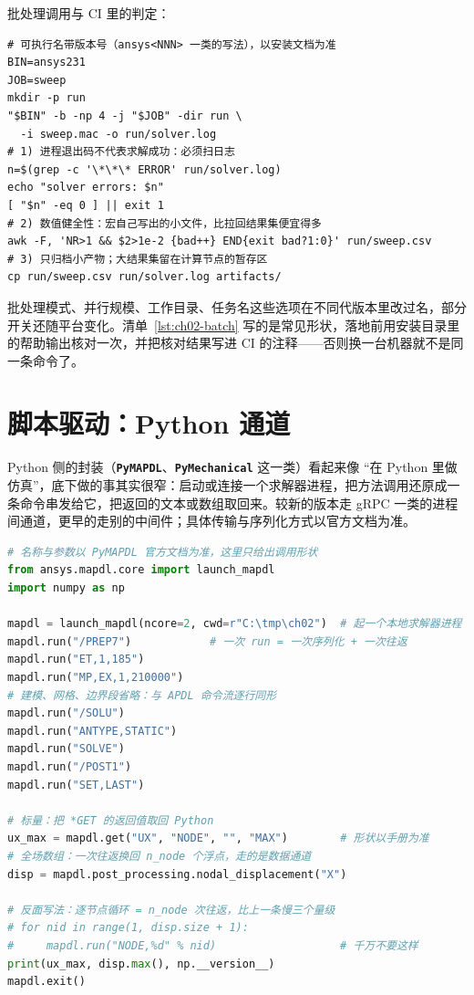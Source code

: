 \documentclass[12pt,a4paper,fontset=fandol]{ctexbook}
\newcommand{\Lib}[1]{\textbf{\texttt{#1}}}
\begin{document}
批处理调用与 CI 里的判定：

\begin{lstlisting}[language=ShellLD, style=shellstyle,
  caption={CI 中一次批处理求解：日志与结果文件分别处理},
  label={lst:ch02-batch}]
# 可执行名带版本号（ansys<NNN> 一类的写法），以安装文档为准
BIN=ansys231
JOB=sweep
mkdir -p run
"$BIN" -b -np 4 -j "$JOB" -dir run \
  -i sweep.mac -o run/solver.log
# 1) 进程退出码不代表求解成功：必须扫日志
n=$(grep -c '\*\*\* ERROR' run/solver.log)
echo "solver errors: $n"
[ "$n" -eq 0 ] || exit 1
# 2) 数值健全性：宏自己写出的小文件，比拉回结果集便宜得多
awk -F, 'NR>1 && $2>1e-2 {bad++} END{exit bad?1:0}' run/sweep.csv
# 3) 只归档小产物；大结果集留在计算节点的暂存区
cp run/sweep.csv run/solver.log artifacts/
\end{lstlisting}

\begin{note}[title={命令行选项的口径要按版本重新确认}]
批处理模式、并行规模、工作目录、任务名这些选项在不同代版本里改过名，部分开关还随平台变化。清单~\ref{lst:ch02-batch} 写的是常见形状，落地前用安装目录里的帮助输出核对一次，并把核对结果写进 CI 的注释——否则换一台机器就不是同一条命令了。
\end{note}

\section{脚本驱动：Python 通道}
\label{sec:ch02-python}

Python 侧的封装（\Lib{PyMAPDL}、\Lib{PyMechanical} 这一类）看起来像 ``在 Python 里做仿真''，底下做的事其实很窄：启动或连接一个求解器进程，把方法调用还原成一条命令串发给它，把返回的文本或数组取回来。较新的版本走 gRPC 一类的进程间通道，更早的走别的中间件；具体传输与序列化方式以官方文档为准。

\begin{lstlisting}[language=Python, style=pythonstyle,
  caption={Python 通道：一次调用一次往返，取结果是整份数组拷贝},
  label={lst:ch02-python}]
# 名称与参数以 PyMAPDL 官方文档为准，这里只给出调用形状
from ansys.mapdl.core import launch_mapdl
import numpy as np

mapdl = launch_mapdl(ncore=2, cwd=r"C:\tmp\ch02")  # 起一个本地求解器进程
mapdl.run("/PREP7")            # 一次 run = 一次序列化 + 一次往返
mapdl.run("ET,1,185")
mapdl.run("MP,EX,1,210000")
# 建模、网格、边界段省略：与 APDL 命令流逐行同形
mapdl.run("/SOLU")
mapdl.run("ANTYPE,STATIC")
mapdl.run("SOLVE")
mapdl.run("/POST1")
mapdl.run("SET,LAST")

# 标量：把 *GET 的返回值取回 Python
ux_max = mapdl.get("UX", "NODE", "", "MAX")        # 形状以手册为准
# 全场数组：一次往返换回 n_node 个浮点，走的是数据通道
disp = mapdl.post_processing.nodal_displacement("X")

# 反面写法：逐节点循环 = n_node 次往返，比上一条慢三个量级
# for nid in range(1, disp.size + 1):
#     mapdl.run("NODE,%d" % nid)                   # 千万不要这样
print(ux_max, disp.max(), np.__version__)
mapdl.exit()
\end{lstlisting}
\end{document}
